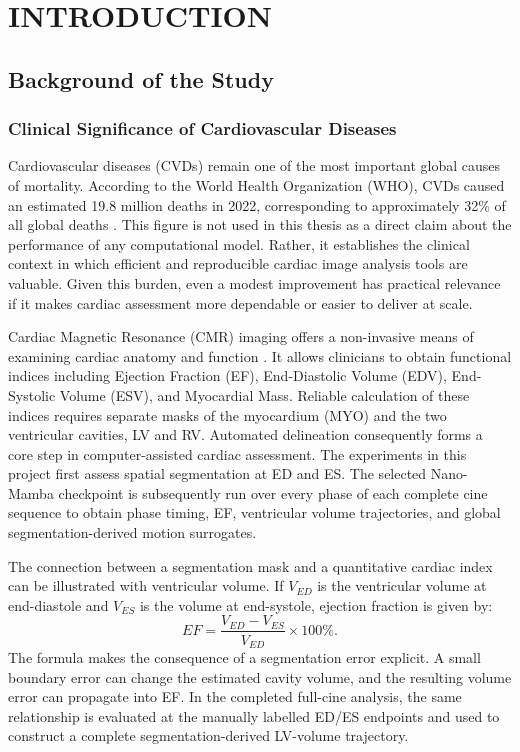 
\chapter{INTRODUCTION}
\label{chap:intro}

\section{Background of the Study}

\subsection{Clinical Significance of Cardiovascular Diseases}
Cardiovascular diseases (CVDs) remain one of the most important global causes of mortality. According to the World Health Organization (WHO), CVDs caused an estimated 19.8 million deaths in 2022, corresponding to approximately 32\% of all global deaths \citep{who2025cvd}. This figure is not used in this thesis as a direct claim about the performance of any computational model. Rather, it establishes the clinical context in which efficient and reproducible cardiac image analysis tools are valuable. Given this burden, even a modest improvement has practical relevance if it makes cardiac assessment more dependable or easier to deliver at scale.

Cardiac Magnetic Resonance (CMR) imaging offers a non-invasive means of examining cardiac anatomy and function \citep{bernard2018deep}. It allows clinicians to obtain functional indices including Ejection Fraction (EF), End-Diastolic Volume (EDV), End-Systolic Volume (ESV), and Myocardial Mass. Reliable calculation of these indices requires separate masks of the myocardium (MYO) and the two ventricular cavities, LV and RV. Automated delineation consequently forms a core step in computer-assisted cardiac assessment. The experiments in this project first assess spatial segmentation at ED and ES. The selected Nano-Mamba checkpoint is subsequently run over every phase of each complete cine sequence to obtain phase timing, EF, ventricular volume trajectories, and global segmentation-derived motion surrogates.

The connection between a segmentation mask and a quantitative cardiac index can be illustrated with ventricular volume. If $V_{ED}$ is the ventricular volume at end-diastole and $V_{ES}$ is the volume at end-systole, ejection fraction is given by:
\begin{equation}
    EF = \frac{V_{ED}-V_{ES}}{V_{ED}}\times 100\%.
\end{equation}
The formula makes the consequence of a segmentation error explicit. A small boundary error can change the estimated cavity volume, and the resulting volume error can propagate into EF. In the completed full-cine analysis, the same relationship is evaluated at the manually labelled ED/ES endpoints and used to construct a complete segmentation-derived LV-volume trajectory.

